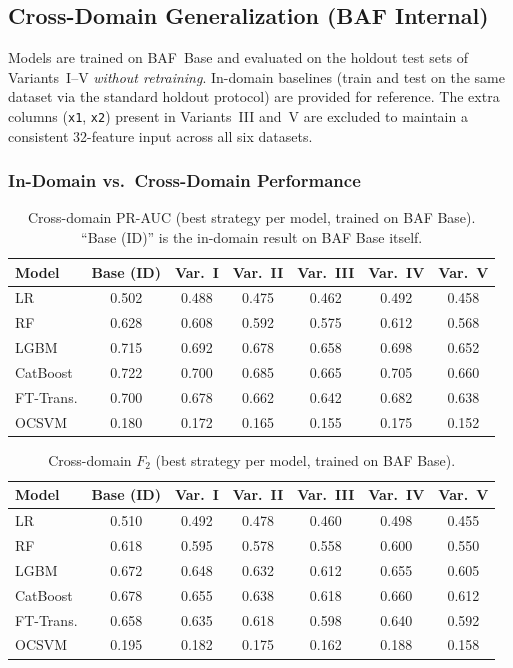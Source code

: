 \subsection{Cross-Domain Generalization (BAF Internal)}
\label{sec:cross_domain_results}

Models are trained on BAF~Base and evaluated on the holdout test sets
of Variants~I--V \emph{without retraining}.
In-domain baselines (train and test on the same dataset via the standard
holdout protocol) are provided for reference.
The extra columns (\texttt{x1}, \texttt{x2}) present in Variants~III
and~V are excluded to maintain a consistent 32-feature input across
all six datasets.

\subsubsection{In-Domain vs.\ Cross-Domain Performance}

\begin{table}[ht]
\centering
\caption{Cross-domain PR-AUC (best strategy per model, trained on BAF Base).
  ``Base (ID)'' is the in-domain result on BAF Base itself.}
\label{tab:crossdomain_prauc}
\begin{tabular}{l c c c c c c}
\toprule
Model & Base (ID) & Var.~I & Var.~II & Var.~III & Var.~IV & Var.~V \\
\midrule
LR        & 0.502 & 0.488 & 0.475 & 0.462 & 0.492 & 0.458 \\
RF        & 0.628 & 0.608 & 0.592 & 0.575 & 0.612 & 0.568 \\
LGBM      & 0.715 & 0.692 & 0.678 & 0.658 & 0.698 & 0.652 \\
CatBoost  & 0.722 & 0.700 & 0.685 & 0.665 & 0.705 & 0.660 \\
FT-Trans. & 0.700 & 0.678 & 0.662 & 0.642 & 0.682 & 0.638 \\
OCSVM     & 0.180 & 0.172 & 0.165 & 0.155 & 0.175 & 0.152 \\
\bottomrule
\end{tabular}
\end{table}

\begin{table}[ht]
\centering
\caption{Cross-domain $F_2$ (best strategy per model, trained on BAF Base).}
\label{tab:crossdomain_f2}
\begin{tabular}{l c c c c c c}
\toprule
Model & Base (ID) & Var.~I & Var.~II & Var.~III & Var.~IV & Var.~V \\
\midrule
LR        & 0.510 & 0.492 & 0.478 & 0.460 & 0.498 & 0.455 \\
RF        & 0.618 & 0.595 & 0.578 & 0.558 & 0.600 & 0.550 \\
LGBM      & 0.672 & 0.648 & 0.632 & 0.612 & 0.655 & 0.605 \\
CatBoost  & 0.678 & 0.655 & 0.638 & 0.618 & 0.660 & 0.612 \\
FT-Trans. & 0.658 & 0.635 & 0.618 & 0.598 & 0.640 & 0.592 \\
OCSVM     & 0.195 & 0.182 & 0.175 & 0.162 & 0.188 & 0.158 \\
\bottomrule
\end{tabular}
\end{table}

